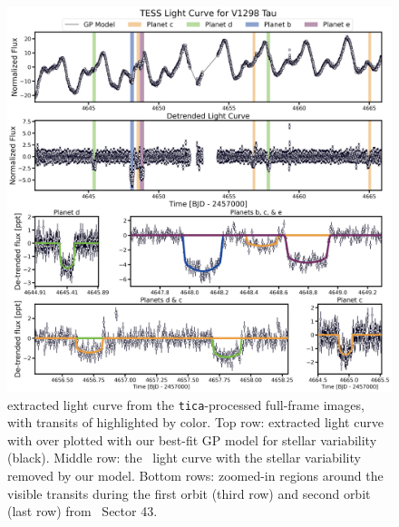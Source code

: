 \documentclass[twocolumn]{aastex631}
\begin{document}
\begin{figure}[!ht]
\begin{center}
\includegraphics[width=\textwidth,trim={0.25cm 0 0 0}]{figures/lightcurve.pdf}
\caption{\sname extracted light curve from the \texttt{tica}-processed full-frame images, with transits of \allplanets highlighted by color. Top row: extracted light curve with over plotted with our best-fit GP model for stellar variability (black). Middle row: the \tess\ light curve with the stellar variability removed by our model. Bottom rows: zoomed-in regions around the visible transits during the first orbit (third row) and second orbit (last row) from \tess\ Sector 43. \label{fig:transits}}
\end{center}
\end{figure}
\end{document}
